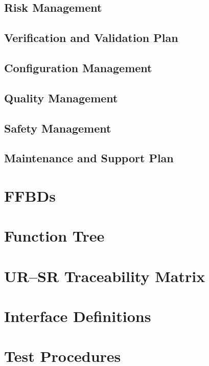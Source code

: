 \documentclass[a4paper,10pt]{article} %
\begin{document}
\subsection{Risk Management}

\subsection{Verification and Validation Plan}

\subsection{Configuration Management}

\subsection{Quality Management}

\subsection{Safety Management}

\subsection{Maintenance and Support Plan}

\newpage

\printbibliography

\newpage

\appendix

\section{FFBDs}

\section{Function Tree}

\section{UR--SR Traceability Matrix}

\section{Interface Definitions}

\section{Test Procedures}
\end{document}
